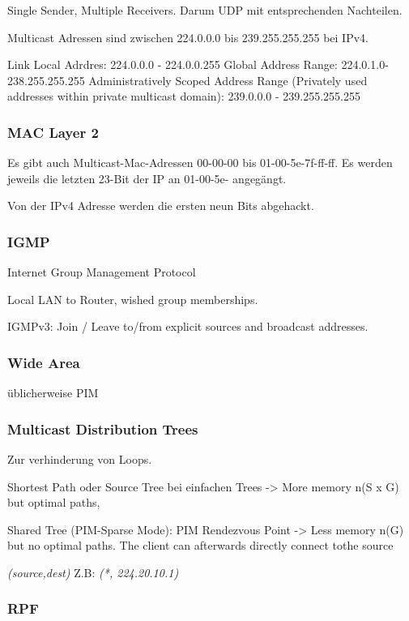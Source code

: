 Single Sender, Multiple Receivers. Darum UDP mit entsprechenden Nachteilen.


Multicast Adressen sind zwischen 224.0.0.0 bis 239.255.255.255 bei IPv4.

Link Local Adrdres: 224.0.0.0 - 224.0.0.255
Global Address Range: 224.0.1.0-238.255.255.255
Administratively Scoped Address Range (Privately used addresses within private multicast domain): 239.0.0.0 - 239.255.255.255



\subsubsection{MAC Layer 2}
	Es gibt auch Multicast-Mac-Adressen 00-00-00 bis 01-00-5e-7f-ff-ff.
	Es werden jeweils die letzten 23-Bit der IP an 01-00-5e- angegängt.
	
	Von der IPv4 Adresse werden die ersten neun Bits abgehackt.

\subsubsection{IGMP}

Internet Group Management Protocol

Local LAN to Router, wished group memberships.

IGMPv3: Join / Leave to/from explicit sources and broadcast addresses.

\subsubsection{Wide Area}
üblicherweise PIM

\subsubsection{Multicast Distribution Trees}

Zur verhinderung von Loops.

Shortest Path oder Source Tree bei einfachen Trees
-> More memory n(S x G) but optimal paths,


Shared Tree (PIM-Sparse Mode): PIM Rendezvous Point 
-> Less memory n(G) but no optimal paths. The client can afterwards directly connect tothe source

\emph{(source,dest)}
Z.B: \emph{(*, 224.20.10.1)}

\subsubsection{RPF}

